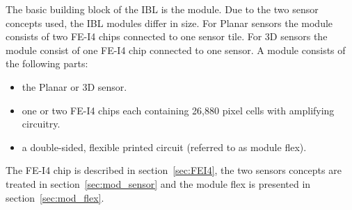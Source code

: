 The basic building block of the IBL is the module. Due to the two sensor concepts used, the IBL modules differ in size.
For Planar sensors the module consists of two FE-I4 chips connected to one sensor tile. For 3D sensors the module consist of one
FE-I4 chip connected to one sensor. A module consists of the following parts:

\begin{itemize}
\item the Planar or 3D sensor.
\item one or two FE-I4 chips each containing 26,880 pixel cells with amplifying circuitry.
\item a double-sided, flexible printed circuit (referred to as module flex).
\end{itemize}

The FE-I4 chip is described in section~\ref{sec:FEI4},  the two sensors concepts are treated in section~\ref{sec:mod_sensor} and the module flex is presented in section~\ref{sec:mod_flex}.

